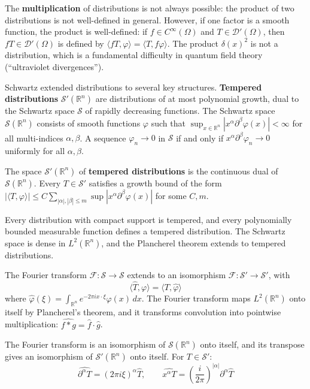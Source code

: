 The \textbf{multiplication} of distributions is not always possible: the product of two distributions is not well-defined in general. However, if one factor is a smooth function, the product is well-defined: if $f \in C^\infty(\Omega)$ and $T \in \mathcal{D}'(\Omega)$, then $fT \in \mathcal{D}'(\Omega)$ is defined by $\langle fT, \varphi \rangle = \langle T, f\varphi \rangle$. The product $\delta(x)^2$ is not a distribution, which is a fundamental difficulty in quantum field theory (``ultraviolet divergences'').

Schwartz extended distributions to several key structures. \textbf{Tempered distributions} $\mathcal{S}'(\mathbb{R}^n)$ are distributions of at most polynomial growth, dual to the Schwartz space $\mathcal{S}$ of rapidly decreasing functions. The Schwartz space $\mathcal{S}(\mathbb{R}^n)$ consists of smooth functions $\varphi$ such that $\sup_{x \in \mathbb{R}^n} |x^\alpha \partial^\beta \varphi(x)| < \infty$ for all multi-indices $\alpha, \beta$. A sequence $\varphi_n \to 0$ in $\mathcal{S}$ if and only if $x^\alpha \partial^\beta \varphi_n \to 0$ uniformly for all $\alpha, \beta$.

\begin{definition}
The space $\mathcal{S}'(\mathbb{R}^n)$ of \textbf{tempered distributions} is the continuous dual of $\mathcal{S}(\mathbb{R}^n)$. Every $T \in \mathcal{S}'$ satisfies a growth bound of the form $|\langle T, \varphi \rangle| \leq C \sum_{|\alpha|,|\beta| \leq m} \sup |x^\alpha \partial^\beta \varphi(x)|$ for some $C, m$.
\end{definition}

Every distribution with compact support is tempered, and every polynomially bounded measurable function defines a tempered distribution. The Schwartz space is dense in $L^2(\mathbb{R}^n)$, and the Plancherel theorem extends to tempered distributions.

The Fourier transform $\mathcal{F}: \mathcal{S} \to \mathcal{S}$ extends to an isomorphism $\mathcal{F}: \mathcal{S}' \to \mathcal{S}'$, with
\[\langle \hat{T}, \varphi \rangle = \langle T, \hat{\varphi} \rangle\]
where $\hat{\varphi}(\xi) = \int_{\mathbb{R}^n} e^{-2\pi i x \cdot \xi} \varphi(x) \, dx$. The Fourier transform maps $L^2(\mathbb{R}^n)$ onto itself by Plancherel's theorem, and it transforms convolution into pointwise multiplication: $\widehat{f * g} = \hat{f} \cdot \hat{g}$.

\begin{theorem}\label{thm:fourier_tempered}
The Fourier transform is an isomorphism of $\mathcal{S}(\mathbb{R}^n)$ onto itself, and its transpose gives an isomorphism of $\mathcal{S}'(\mathbb{R}^n)$ onto itself. For $T \in \mathcal{S}'$:
\[\widehat{\partial^\alpha T} = (2\pi i \xi)^\alpha \hat{T}, \qquad \widehat{x^\alpha T} = \left(\frac{i}{2\pi}\right)^{|\alpha|} \partial^\alpha \hat{T}\]
\end{theorem}

